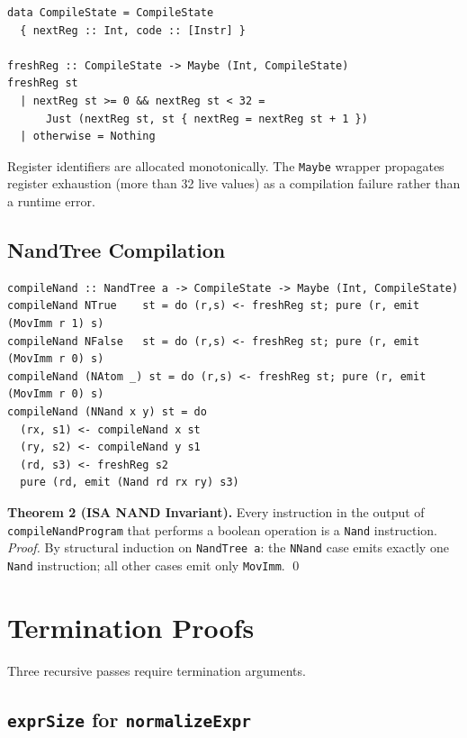 \documentclass[sigconf,natbib=false]{acmart}
\begin{document}
\begin{lstlisting}[style=haskell,caption={CompileState and freshReg}]
data CompileState = CompileState
  { nextReg :: Int, code :: [Instr] }

freshReg :: CompileState -> Maybe (Int, CompileState)
freshReg st
  | nextReg st >= 0 && nextReg st < 32 =
      Just (nextReg st, st { nextReg = nextReg st + 1 })
  | otherwise = Nothing
\end{lstlisting}

Register identifiers are allocated monotonically. The \texttt{Maybe} wrapper
propagates register exhaustion (more than 32 live values) as a compilation
failure rather than a runtime error.

\subsection{NandTree Compilation}

\begin{lstlisting}[style=haskell,caption={compileNand: NandTree -> Maybe Program}]
compileNand :: NandTree a -> CompileState -> Maybe (Int, CompileState)
compileNand NTrue    st = do (r,s) <- freshReg st; pure (r, emit (MovImm r 1) s)
compileNand NFalse   st = do (r,s) <- freshReg st; pure (r, emit (MovImm r 0) s)
compileNand (NAtom _) st = do (r,s) <- freshReg st; pure (r, emit (MovImm r 0) s)
compileNand (NNand x y) st = do
  (rx, s1) <- compileNand x st
  (ry, s2) <- compileNand y s1
  (rd, s3) <- freshReg s2
  pure (rd, emit (Nand rd rx ry) s3)
\end{lstlisting}

\textbf{Theorem 2 (ISA NAND Invariant).} Every instruction in the output of
\texttt{compileNandProgram} that performs a boolean operation is a \texttt{Nand}
instruction. \textit{Proof.} By structural induction on \texttt{NandTree a}: the
\texttt{NNand} case emits exactly one \texttt{Nand} instruction; all other cases
emit only \texttt{MovImm}. \qed


\section{Termination Proofs}
\label{sec:termination}

Three recursive passes require termination arguments.

\subsection{\texttt{exprSize} for \texttt{normalizeExpr}}
\end{document}
